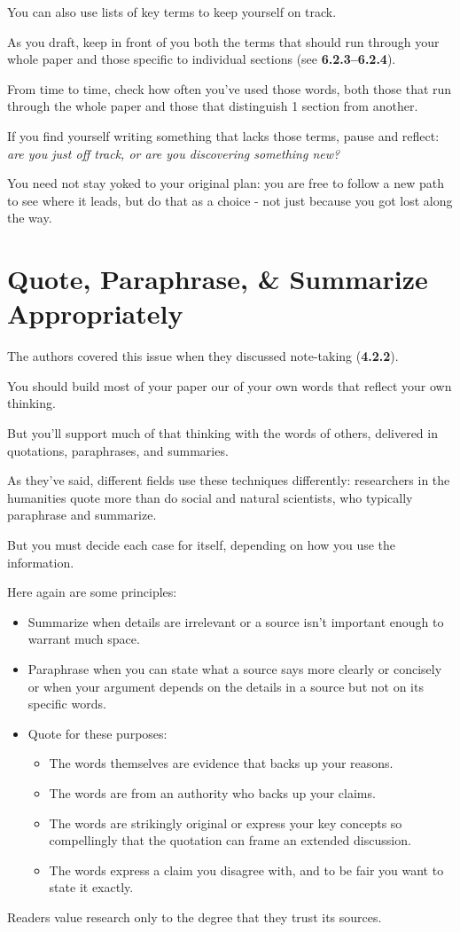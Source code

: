 \documentclass[oneside]{book}
\numberwithin{equation}{section}
\begin{document}
%
You can also use lists of key terms to keep yourself on track.

As you draft, keep in front of you both the terms that should run through your whole paper and those specific to individual sections (see \textbf{6.2.3--6.2.4}).

From time to time, check how often you've used those words, both those that run through the whole paper and those that distinguish 1 section from another.

If you find yourself writing something that lacks those terms, pause and reflect: \textit{are you just off track, or are you discovering something new?}

You need not stay yoked to your original plan: you are free to follow a new path to see where it leads, but do that as a choice - not just because you got lost along the way.

\section{Quote, Paraphrase, \& Summarize Appropriately}
The authors covered this issue when they discussed note-taking (\textbf{4.2.2}).

You should build most of your paper our of your own words that reflect your own thinking.

But you'll support much of that thinking with the words of others, delivered in quotations, paraphrases, and summaries.

As they've said, different fields use these techniques differently: researchers in the humanities quote more than do social and natural scientists, who typically paraphrase and summarize.

But you must decide each case for itself, depending on how you use the information.

Here again are some principles:
\begin{itemize}
    \item Summarize when details are irrelevant or a source isn't important enough to warrant much space.
    \item Paraphrase when you can state what a source says more clearly or concisely or when your argument depends on the details in a source but not on its specific words.
    \item Quote for these purposes:
    \begin{itemize}
        \item The words themselves are evidence that backs up your reasons.
        \item The words are from an authority who backs up your claims.
        \item The words are strikingly original or express your key concepts so compellingly that the quotation can frame an extended discussion.
        \item The words express a claim you disagree with, and to be fair you want to state it exactly.
    \end{itemize}
\end{itemize}
Readers value research only to the degree that they trust its sources.
\end{document}
